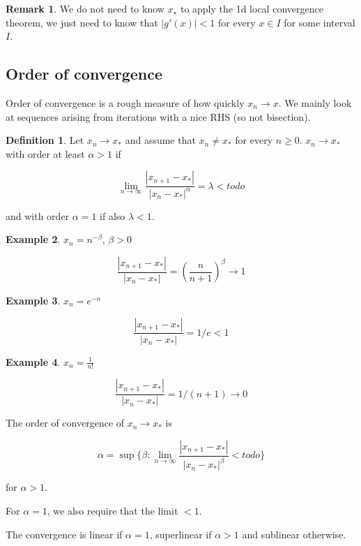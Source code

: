 \documentclass[12pt,a4paper]{article}
\theoremstyle{definition}
\newtheorem{definition}{Definition}[subsection]
\newtheorem{example}[definition]{Example}
\newtheorem*{remark}{Remark}
\begin{document}
\begin{remark}
	We do not need to know $x_{\star}$ to apply the 1d local convergence theorem, we just need to know that $|g'(x)| < 1$ for every $x \in I$ for some interval $I$.
\end{remark}

\subsection{Order of convergence}

Order of convergence is a rough measure of how quickly $x_n \rightarrow x$. We mainly look at sequences arising from iterations with a nice RHS (so not bisection).

\begin{definition}
	Let $x_n \rightarrow x_*$ and assume that $x_n \ne x_*$ for every $n \ge 0$. $x_n \rightarrow x_*$ with order at least $\alpha > 1$ if

	\[\lim_{n \rightarrow \infty} \frac{|x_{n + 1} - x_*|}{|x_n - x_*|^{\alpha}} = \lambda < todo\]

	and with order $\alpha = 1$ if also $\lambda < 1$.
\end{definition}

\begin{example}
	$x_n = n^{-\beta}$, $\beta > 0$

	\[\frac{|x_{n + 1} - x_*|}{|x_n - x_*|} = (\frac{n}{n + 1})^{\beta} \rightarrow 1\]
\end{example}

\begin{example}
	$x_n = e^{-n}$

	\[\frac{|x_{n + 1} - x_*|}{|x_n - x_*|} = 1/e < 1\]
\end{example}

\begin{example}
	$x_n = \frac{1}{n!}$

	\[\frac{|x_{n + 1} - x_*|}{|x_n - x_*|} = 1/(n + 1) \rightarrow 0\]
\end{example}

The order of convergence of $x_n \rightarrow x_*$ is

\[\alpha = \sup \{\beta: \lim_{n \rightarrow \infty} \frac{|x_{n + 1} - x_*|}{|x_n - x_*|^{\beta}} < todo\}\]

for $\alpha > 1$.

For $\alpha = 1$, we also require that the limit $< 1$.

The convergence is linear if $\alpha = 1$, superlinear if $\alpha > 1$ and sublinear otherwise.
\end{document}
